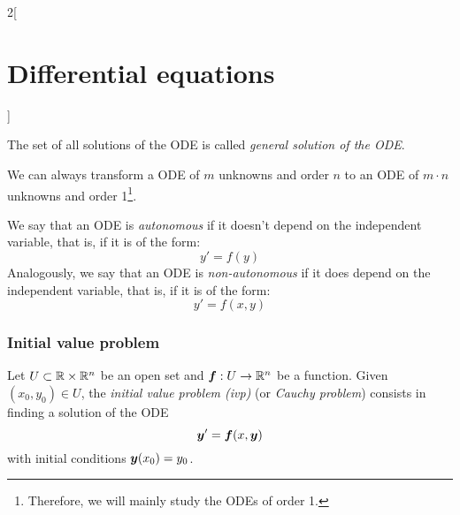 \documentclass[../../../main.tex]{subfiles}
\begin{document}
\begin{multicols}{2}[\section{Differential equations}]
\begin{definition}
\begin{itemize}
    \end{itemize}
    The set of all solutions of the ODE is called \textit{general solution of the ODE}.
  \end{definition}
  \begin{prop}
    We can always transform a ODE of $m$ unknowns and order $n$ to an ODE of $m\cdot n$ unknowns and order 1\footnote{Therefore, we will mainly study the ODEs of order 1.}.
  \end{prop}
  \begin{definition}
    We say that an ODE is \textit{autonomous} if it doesn't depend on the independent variable, that is, if it is of the form: $$y'=f(y)$$ Analogously, we say that an ODE is \textit{non-autonomous} if it does depend on the independent variable, that is, if it is of the form: $$y'=f(x,y)$$
  \end{definition}
  \subsubsection*{Initial value problem}
  \begin{definition}
    Let $U\subset\mathbb{R}\times\mathbb{R}^n$ be an open set and $\boldsymbol{f}:U\rightarrow\mathbb{R}^n$ be a function. Given $(x_0,y_0)\in U$, the \textit{initial value problem (ivp)} (or \textit{Cauchy problem}) consists in finding a solution of the ODE $$\boldsymbol{y}'=\boldsymbol{f}(x,\boldsymbol{y})$$ with initial conditions $\boldsymbol{y}(x_0)=y_0$.
  \end{definition}

\end{multicols}
\end{document}
